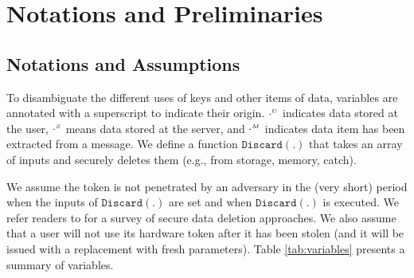 
\section{Notations and Preliminaries}

 \subsection{Notations and Assumptions}
  
 To disambiguate the different uses of keys and other items of data, variables are annotated with a superscript to indicate their origin. $\cdot^{\scriptscriptstyle U}$ indicates data stored at the user, $\cdot^{\scriptscriptstyle S}$ means data stored at the server, and $\cdot^{\scriptscriptstyle M}$ indicates data item has been extracted from a message. We define a function $\mathtt{Discard}(.)$ that takes an array of inputs and securely deletes them (e.g., from storage, memory, catch). 
 
 We assume the token is not penetrated by an adversary in the (very short) period when the inputs of $\mathtt{Discard}(.)$ are set and when  $\mathtt{Discard}(.)$ is executed. We refer readers to \cite{ReardonBC13} for a survey of secure data deletion approaches. We also assume that a user will not use its hardware token after it has been stolen (and it will be issued with a replacement with fresh parameters). Table \ref{tab:variables} presents a summary of variables. 
 
 
 
 
% 
% 
% 
% 
% 
% 
% 
% 
% 
 
